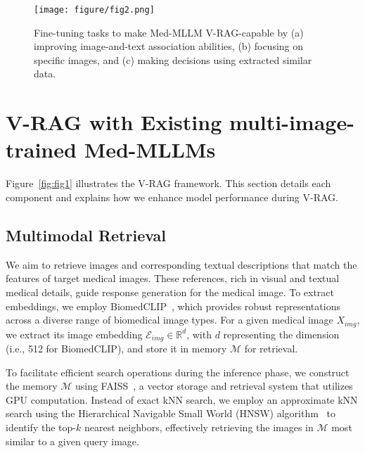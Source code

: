

\begin{figure*}[t]
    \centering
    \setlength{\abovecaptionskip}{1mm}
    \texttt{[image: figure/fig2.png]}
    \caption{Fine-tuning tasks to make Med-MLLM V-RAG-capable by (a) improving image-and-text association abilities, (b) focusing on specific images, and (c) making decisions using extracted similar data.}
    \vspace{-3mm}
    \label{fig:tasks}
\end{figure*}










\section{V-RAG with Existing multi-image-trained Med-MLLMs}
\label{sec:v-rag-method}
Figure~\ref{fig:fig1} illustrates the V-RAG framework. This section details each component and explains how we enhance model performance during V-RAG.


\subsection{Multimodal Retrieval}

We aim to retrieve images and corresponding textual descriptions that match the features of target medical images. These references, rich in visual and textual medical details, guide response generation for the medical image.
To extract embeddings, we employ BiomedCLIP~\cite{Zhang2023BiomedCLIPAM}, which provides robust representations across a diverse range of biomedical image types. For a given medical image $X_{img}$, we extract its image embedding $\mathcal{E}_{img} \in \mathbb{R}^{d}$, with $d$ representing the dimension (i.e., 512 for BiomedCLIP), and store it in memory $\mathcal{M}$ for retrieval.

To facilitate efficient search operations during the inference phase, we construct the memory $\mathcal{M}$ using FAISS~\cite{douze2024faiss}, a vector storage and retrieval system that utilizes GPU computation. Instead of exact kNN search, we employ an approximate kNN search using the Hierarchical Navigable Small World (HNSW) algorithm~\cite{Malkov2016EfficientAR} to identify the top-$k$ nearest neighbors, effectively retrieving the images in $\mathcal{M}$ most similar to a given query image.


